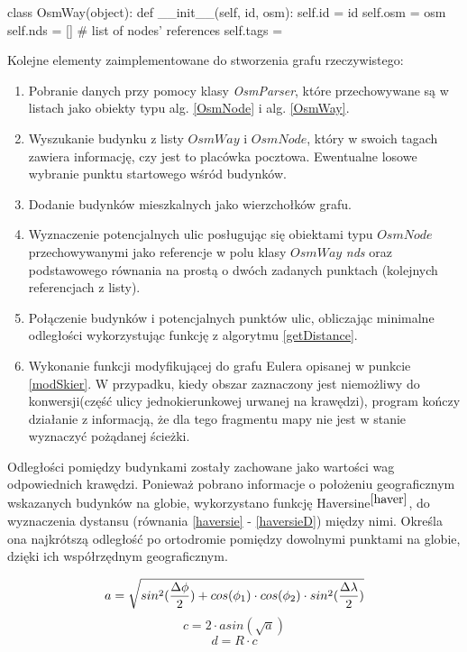 \documentclass[a4paper, 12pt, twoside, openright]{article}
\begin{document}
\begin{algorithm}[caption={\textit{OsmWay} struktura tagu XML - $node$, w którym przechowywane są punkty.}, label={OsmWay}]
	class OsmWay(object):
		def __init__(self, id, osm):
			self.id = id
			self.osm = osm
			self.nds = []  # list of nodes' references
			self.tags = {}
\end{algorithm}

Kolejne elementy zaimplementowane do stworzenia grafu rzeczywistego:
\begin{enumerate}
	\item Pobranie danych przy pomocy klasy \textit{OsmParser}, które przechowywane są w listach jako obiekty typu alg. \ref{OsmNode} i alg. \ref{OsmWay}.   
	\item Wyszukanie budynku z listy $OsmWay$ i $OsmNode$, który w swoich tagach zawiera informację, czy jest to placówka pocztowa. Ewentualne losowe wybranie punktu startowego wśród budynków.
	\item Dodanie budynków mieszkalnych jako wierzchołków grafu.
	\item Wyznaczenie potencjalnych ulic posługując się obiektami typu $OsmNode$ przechowywanymi jako referencje w polu klasy $OsmWay$ \textit{nds} oraz podstawowego równania na prostą o dwóch zadanych punktach (kolejnych referencjach z listy).
	\item Połączenie budynków i potencjalnych punktów ulic, obliczając minimalne odległości wykorzystując funkcję z algorytmu \ref{getDistance}.
	\item Wykonanie funkcji modyfikującej do grafu Eulera opisanej w punkcie \ref{modSkier}. W przypadku, kiedy obszar zaznaczony jest niemożliwy do konwersji(część ulicy jednokierunkowej urwanej na krawędzi), program kończy działanie z informacją, że dla tego fragmentu mapy nie jest w stanie wyznaczyć pożądanej ścieżki.
\end{enumerate}



Odległości pomiędzy budynkami zostały zachowane jako wartości wag odpowiednich krawędzi. Ponieważ pobrano informacje o położeniu geograficznym wskazanych budynków na globie, wykorzystano funkcję Haversine$^{\cite{haver}}$, do wyznaczenia dystansu (równania \ref{haversie} - \ref{haversieD}) między nimi. Określa ona najkrótszą odległość po ortodromie pomiędzy dowolnymi punktami na globie, dzięki ich współrzędnym geograficznym.

\begin{equation} \label{haversie}
	a = \sqrt{sin^2({{\Delta\phi}\over{2}}) + cos(\phi_1) \cdot cos(\phi_2) \cdot sin^2({{\Delta\lambda}\over{2}})}
\end{equation}
\begin{equation} \label{haversieC}
	c = 2 \cdot asin(\sqrt{a})
\end{equation}
\begin{equation} \label{haversieD}
	d = R \cdot c
\end{equation}
\end{document}
